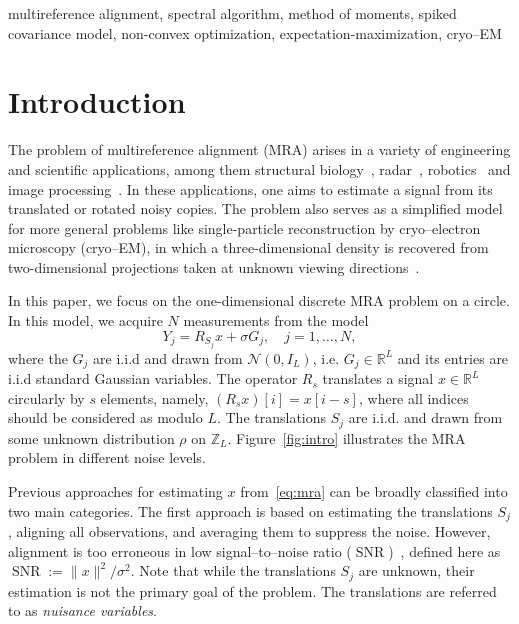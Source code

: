 \documentclass{IEEEtran}
\numberwithin{equation}{section}
\numberwithin{figure}{section}
\theoremstyle{plain}
\theoremstyle{definition}
\theoremstyle{remark}
\theoremstyle{plain}
\theoremstyle{remark}
\theoremstyle{plain}
\theoremstyle{plain}
\theoremstyle{remark}
\newcommand{\RL}{\mathbb{R}^L}
\newcommand{\SNR}{\operatorname{SNR}}
\newcommand{\N}{{\mathcal{N}}}
\newcommand{\Z}{{\mathbb{Z}}}
\begin{document}
\begin{IEEEkeywords} 
multireference alignment, spectral algorithm, method of moments, spiked covariance model, non-convex optimization, expectation-maximization, cryo--EM
\end{IEEEkeywords}


\section{Introduction}
The problem of multireference alignment (MRA) arises in a variety of engineering and scientific applications, among them structural biology~\cite{diamond1992multiple,theobald2012optimal,park2011stochastic,park2014assembly,scheres2005maximum}, radar~\cite{zwart2003fast,gil2005using}, robotics~\cite{rosen2016certifiably} and image processing~\cite{dryden1998statistical,foroosh2002extension,robinson2009optimal}. In these applications, one aims to estimate a signal from its translated or rotated noisy copies. The problem also serves as a simplified model for more general problems like single-particle reconstruction by cryo--electron microscopy (cryo--EM), in which a three-dimensional density is recovered from two-dimensional projections taken at unknown viewing directions~\cite{bartesaghi20152,sirohi20163,singer2018mathematics}.

In this paper, we focus on the one-dimensional discrete MRA problem on a circle. In this model, we acquire $N$ measurements from the model
\begin{equation}\label{eq:mra}
Y_j = R_{S_j}x + \sigma G_j,\quad j= 1,\dots,N,
\end{equation}
where the $G_j$ are i.i.d and drawn from $\N(0,I_L)$, i.e. $G_j\in \RL$ and its entries are i.i.d standard Gaussian variables. The operator $R_{s}$ translates a signal $x\in\RL$ circularly by $s$ elements, namely, $(R_{s}x)[i]=x[i-s]$, where all indices should be considered as modulo $L$. The translations $S_j$ are i.i.d. and drawn from some unknown distribution $\rho$ on $\Z_L$. Figure~\ref{fig:intro} illustrates the MRA problem in different noise levels.

Previous approaches for estimating $x$ from~\eqref{eq:mra} can be broadly classified into two main categories. The first approach is based on estimating the translations $S_j$, aligning all observations, and averaging them to suppress the noise. However, alignment is too erroneous in low signal--to--noise ratio ($\SNR$)~\cite{aguerrebere2016fundamental,bendory2018toward}, defined here as $\SNR := \|x\|^2 / \sigma^2$. Note that while the translations $S_j$ are unknown, their estimation is not the primary goal of the problem. The translations are referred to as \emph{nuisance variables}.
\end{document}
